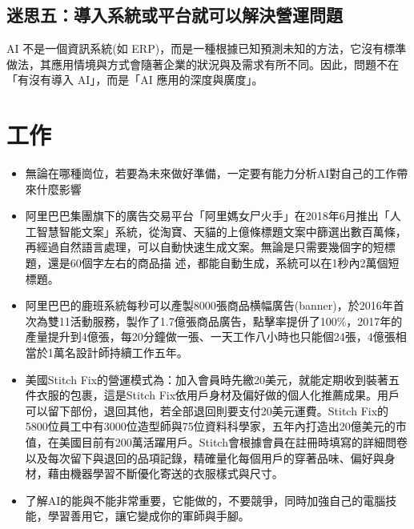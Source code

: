\documentclass[a4paper,12pt]{article}
\begin{document}
\subsection{迷思五：導入系統或平台就可以解決營運問題}
\label{sec:org43f41dc}
AI 不是一個資訊系統(如 ERP)，而是一種根據已知預測未知的方法，它沒有標準做法，其應用情境與方式會隨著企業的狀況與及需求有所不同。因此，問題不在「有沒有導入 AI」，而是「AI 應用的深度與廣度」。\\

\section{工作}
\label{sec:org0abb125}
\begin{itemize}
\item 無論在哪種崗位，若要為未來做好準備，一定要有能力分析AI對自己的工作帶來什麼影響\\
\item 阿里巴巴集團旗下的廣告交易平台「阿里媽女尸火手」在2018年6月推出「人工智慧智能文案」系統，從淘寶、天貓的上億條標題文案中篩選出數百萬條，再經過自然語言處理，可以自動快速生成文案。無論是只需要幾個字的短標題，還是60個字左右的商品描 述，都能自動生成，系統可以在1秒內2萬個短標題。\\
\item 阿里巴巴的鹿班系統每秒可以產製8000張商品横幅廣告(banner)，於2016年首次為雙11活動服務，製作了1.7億張商品廣告，點擊率提㐼了100\%，2017年的產量提升到4億張，每20分鐘做一張、一天工作八小時也只能個24張，4億張相當於1萬名設計師持續工作五年。\\
\item 美國Stitch Fix的營運模式為：加入會員時先繳20美元，就能定期收到裝著五件衣服的包裹，這是Stitch Fix依用戶身材及偏好做的個人化推薦成果。用戶可以留下部份，退回其他，若全部退回則要支付20美元運費。Stitch Fix的5800位員工中有3000位造型師與75位資料科學家，五年內打造出20億美元的市值，在美國目前有200萬活躍用戶。Stitch會根據會員在註冊時填寫的詳細問卷以及每次留下與退回的品項記錄，精確量化每個用戶的穿著品味、偏好與身材，藉由機器學習不斷優化寄送的衣服樣式與尺寸。\\
\item 了解AI的能與不能非常重要，它能做的，不要競爭，同時加強自己的電腦技能，學習善用它，讓它變成你的軍師與手腳。\\
\end{itemize}
\end{document}
